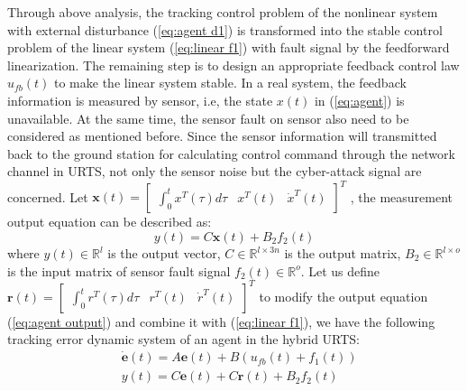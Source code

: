 \documentclass{ieeeaccess}
\begin{document}
Through above analysis, the tracking control problem of the nonlinear system with external disturbance (\ref{eq:agent d1}) is transformed into the stable control problem of the linear system (\ref{eq:linear f1}) with fault signal by the feedforward linearization. The remaining step is to design an appropriate feedback control law $u_{fb}(t)$ to make the linear system stable. In a real system, the feedback information is measured by sensor, i.e, the state $x(t)$ in (\ref{eq:agent}) is unavailable. At the same time, the sensor fault on sensor also need to be considered as mentioned before. Since the sensor information will transmitted back to the ground station for calculating control command through the network channel in URTS, not only the sensor noise but the cyber-attack signal are concerned. Let $\pmb{x}(t)=\begin{bmatrix}
    \int_{0}^{t}x^T(\tau)d\tau & x^T(t) & \dot{x}^T(t)
\end{bmatrix}^T$
, the measurement output equation can be described as:
\begin{equation} \label{eq:agent output}
    y(t) = C\pmb{x}(t) + B_2f_2(t)
\end{equation}
where $y(t)\in\mathbb{R}^{l}$ is the output vector, $C\in\mathbb{R}^{l\times 3n}$ is the output matrix, $B_2\in\mathbb{R}^{l\times o}$ is the input matrix of sensor fault signal $f_2(t)\in\mathbb{R}^o$. Let us define $\pmb{r}(t)=\begin{bmatrix}
    \int_{0}^{t}r^T(\tau)d\tau & r^T(t) & \dot{r}^T(t)
\end{bmatrix}^T$ to modify the output equation (\ref{eq:agent output}) and combine it with (\ref{eq:linear f1}), we have the following tracking error dynamic system of an agent in the hybrid URTS:
\begin{equation} \label{eq:error}
    \begin{split}
        & \dot{\pmb{e}}(t)=A\pmb{e}(t)+B(u_{fb}(t)+f_1(t)) \\
        & y(t) = C\pmb{e}(t) + C\pmb{r}(t) + B_2f_2(t)   
    \end{split}  
\end{equation}
\end{document}
